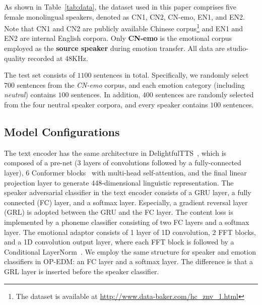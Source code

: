 \documentclass[journal,comsoc]{IEEEtran}
\begin{document}
As shown in Table~\ref{tab:data}, the dataset used in this paper comprises five female monolingual speakers, denoted as CN1, CN2, CN-emo, EN1, and EN2.
Note that CN1 and CN2 are publicly available Chinese corpus\footnote{The dataset is available at \url{http://www.data-baker.com/hc_znv_1.html}} and EN1 and EN2 are internal English corpora.
Only \textbf{CN-emo} is the emotional corpus employed as the \textbf{source speaker} during emotion transfer. 
All data are studio-quality recorded at 48KHz.

The test set consists of $1100$ sentences in total.
Specifically, we randomly select $700$ sentences from the \textit{CN-emo} corpus, and each emotion category (including \textit{neutral}) contains $100$ sentences. 
In addition, $400$ sentences are randomly selected from the four neutral speaker corpora, and every speaker contains $100$ sentences.

\vspace{-0.2cm}
\subsection{Model Configurations}
\label{sc:model_config}

The text encoder has the same architecture in DelightfulTTS~\cite{liu2021delightfultts}, which is composed of a pre-net (3 layers of convolutions followed by a fully-connected layer), 
6 Conformer blocks~\cite{gulati2020conformer} with multi-head self-attention, and the final linear projection layer to generate 448-dimensional linguistic representation. 
The speaker adversarial classifier in the text encoder consists of a GRU layer, a fully connected (FC) layer, and a softmax layer. Especially, a gradient reversal layer (GRL) is adopted between the GRU and the FC layer. 
The content loss is implemented by a phoneme classifier consisting of two FC layers and a softmax layer.
The emotional adaptor consists of 1 layer of 1D convolution, 2 FFT blocks, and a 1D convolution output layer, where each FFT block is followed by a Conditional LayerNorm~\cite{chen2020adaspeech}.
We employ the same structure for speaker and emotion classifiers in OP-EDM: an FC layer and a softmax layer. 
The difference is that a GRL layer is inserted before the speaker classifier.



\vspace{-0.3cm}
\end{document}

